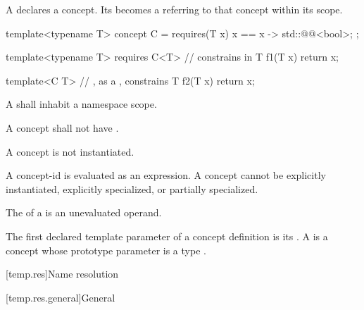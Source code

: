 \pnum
A 
declares a concept.
Its  becomes a 
referring to that concept
within its scope.
\begin{example}
\begin{codeblock}
template<typename T>
concept C = requires(T x) {
  { x == x } -> std::@@<bool>;
};

template<typename T>
  requires C<T>     //  constrains  in 
T f1(T x) { return x; }

template<C T>       // , as a , constrains 
T f2(T x) { return x; }
\end{codeblock}
\end{example}

\pnum
A 
shall inhabit a namespace scope.

\pnum
A concept shall not have .

\pnum
A concept is not instantiated.
\begin{note}
A concept-id is evaluated as an expression.
A concept cannot be
explicitly instantiated,
explicitly specialized,
or partially specialized.
\end{note}

\pnum
The  of a 
is an unevaluated operand.

\pnum
The first declared template parameter of a concept definition is its
.
%
A 
is a concept whose prototype parameter
is a type .

[temp.res]{Name resolution}

[temp.res.general]{General}

